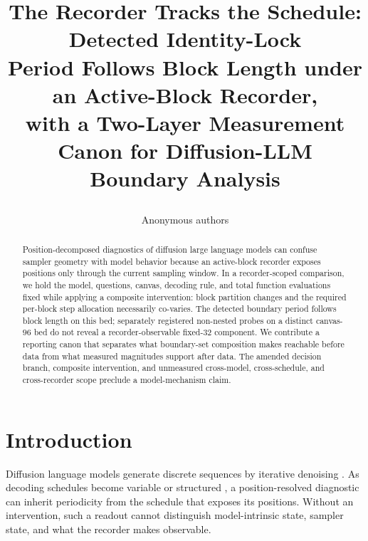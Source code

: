 \documentclass{article}
\title{\raggedright The Recorder Tracks the Schedule: Detected Identity-Lock \\
Period Follows Block Length under an Active-Block Recorder, \\
with a Two-Layer Measurement Canon for Diffusion-LLM Boundary Analysis}
\author{Anonymous authors}
\date{}
\begin{document}
\maketitle
\ificlrfinal
\else
\fi
\pagestyle{fancy}
\thispagestyle{fancy}

\begin{abstract}
Position-decomposed diagnostics of diffusion large language models can confuse
sampler geometry with model behavior because an active-block recorder exposes
positions only through the current sampling window. In a recorder-scoped
comparison, we hold the model, questions, canvas, decoding rule, and total
function evaluations fixed while applying a composite intervention: block
partition changes and the required per-block step allocation necessarily
co-varies. The detected boundary period follows block length on this bed;
separately registered non-nested probes on a distinct canvas-$96$ bed do not
reveal a recorder-observable fixed-$32$ component. We contribute a reporting
canon that separates what boundary-set composition makes reachable before data
from what measured magnitudes support after data. The amended decision branch,
composite intervention, and unmeasured cross-model, cross-schedule, and
cross-recorder scope preclude a model-mechanism claim.
\end{abstract}

\section{Introduction}\label{sec:intro}

Diffusion language models generate discrete sequences by iterative denoising
\citep{austin2021structured,zheng2023reparameterized,lou2024discrete,shi2024simplified,nie2025large}.
As decoding schedules become variable or structured
\citep{li2025beyond,sun2026dystruct,wang2026reversible}, a position-resolved
diagnostic can inherit periodicity from the schedule that exposes its positions.
Without an intervention, such a readout cannot distinguish model-intrinsic state,
sampler state, and what the recorder makes observable.
\end{document}
